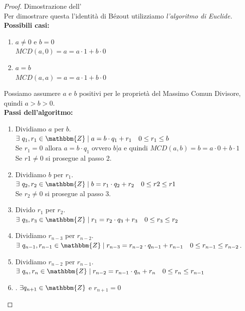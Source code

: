 \documentclass[12pt, letterpaper]{report}
\newcommand{\namerefl}[1]{%
	\bgroup
	\let\nmu\MakeLowercase
	\nameref{#1}\egroup}
\newcommand{\nmu}{}
\begin{document}
		\begin{proof}{Dimostrazione dell'\namerefl{th:Bézout}} \quad \\
			Per dimostrare questa l'identità di Bézout utilizziamo \textit{l'algoritmo di Euclide.} \\
			\textbf{Possibili casi:}
			\begin{enumerate}
				\item $a \neq 0$ e $b = 0$ \\
				$MCD(a,0) = a = a \cdot 1 + b \cdot 0$
				\item $a = b$ \\
				$MCD(a,a) = a = a \cdot 1 + b \cdot 0$
			\end{enumerate}
			Possiamo assumere $a$ e $b$ positivi per le proprietà del Massimo Comun Divisore, quindi $a > b > 0$. \\
			\textbf{Passi dell'algoritmo:}
			\begin{enumerate}
				\item Dividiamo $a$ per $b$. \\
				$\exists\ q_1, r_1 \in \mathbbm{Z} \mid a = b \cdot q_1 + r_1 \quad 0 \leq r_1 \leq b$ \\
				Se $r_1 = 0$ allora $a = b \cdot q_1$ ovvero $b|a$ e quindi $MCD(a,b) = b = a \cdot 0 + b \cdot 1$ \\
				Se $r1 \neq 0$ si prosegue al passo 2.
				\item Dividiamo $b$ per $r_1$. \\
				$\exists\ q_2, r_2 \in \mathbbm{Z} \mid b = r_1 \cdot q_2 + r_2 \quad 0 \leq r2 \leq r1$ \\
				Se $r_2 \neq 0$ si prosegue al passo 3.
				\item Divido $r_1$ per $r_2$. \\
				$\exists\ q_3, r_3 \in \mathbbm{Z} \mid r_1 = r_2 \cdot q_3 + r_3 \quad 0 \leq r_3 \leq r_2$
				\item[$n$ - 1.] Dividiamo $r_{n - 3}$ per $r_{n - 2}$. \\
				$\exists\ q_{n - 1}, r_{n - 1} \in \mathbbm{Z} \mid r_{n - 3} = r_{n - 2} \cdot q_{n - 1} + r_{n - 1} \quad 0 \leq r_{n - 1} \leq r_{n - 2}$.
				\item[$n$.] Dividiamo $r_{n - 2}$ per $r_{n - 1}$. \\
				$\exists\ q_n, r_n \in \mathbbm{Z} \mid r_{n - 2} = r_{n - 1} \cdot q_n + r_n \quad 0 \leq r_n \leq r_{n - 1}$
				\item[$n$ + 1]. $\exists q_{n + 1} \in \mathbbm{Z}$ e $r_{n + 1} = 0$ \\

\end{enumerate}
\end{proof}
\end{document}

